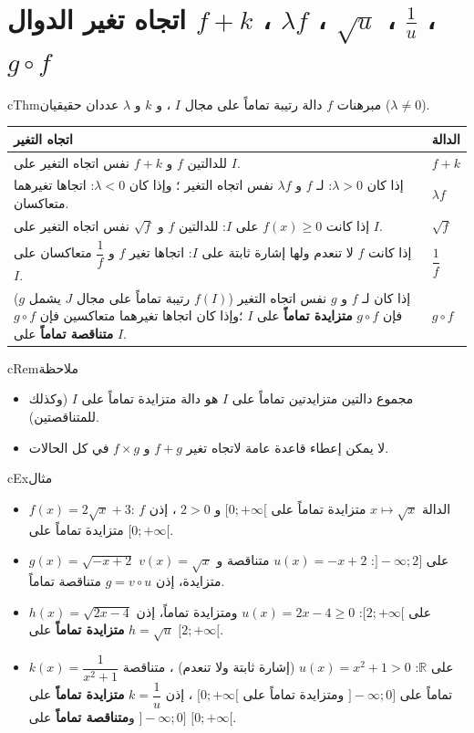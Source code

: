 \documentclass[12pt,a4paper]{article}
\newenvironment{BOX}[2]{\begin{otherlanguage}{english}\begin{arbox}{#1}{#2}}{\end{arbox}\end{otherlanguage}}
\newenvironment{khassia}[1][خاصية]{\begin{BOX}{cThm}{#1}}{\end{BOX}}
\newenvironment{molahada}[1][ملاحظة]{\begin{BOX}{cRem}{#1}}{\end{BOX}}
\newenvironment{mithal}[1][مثال]{\begin{BOX}{cEx}{#1}}{\end{BOX}}
\newcommand{\R}{\mathbb{R}}
\begin{document}
\section{اتجاه تغير الدوال $f+k$ ، $\lambda f$ ، $\sqrt u$ ، $\frac1u$ ، $g\circ f$}
\begin{khassia}[مبرهنات]
$f$ دالة رتيبة تماماً على مجال $I$ ، و $k$ و $\lambda$ عددان حقيقيان ($\lambda\ne0$).
\begin{center}
\renewcommand{\arraystretch}{1.5}
\begin{tabular}{|>{\centering\arraybackslash}m{12.6cm}|>{\centering\arraybackslash}m{2.4cm}|}\hline
\textbf{اتجاه التغير} & \textbf{الدالة}\\\hline
للدالتين $f$ و $f+k$ نفس اتجاه التغير على $I$. & $f+k$\\\hline
إذا كان $\lambda>0$: لـ $f$ و $\lambda f$ نفس اتجاه التغير ؛ وإذا كان $\lambda<0$: اتجاها تغيرهما متعاكسان. & $\lambda f$\\\hline
إذا كانت $f(x)\ge0$ على $I$: للدالتين $f$ و $\sqrt f$ نفس اتجاه التغير على $I$. & $\sqrt f$\\\hline
إذا كانت $f$ لا تنعدم ولها إشارة ثابتة على $I$: اتجاها تغير $f$ و $\dfrac1f$ متعاكسان على $I$. & $\dfrac1f$\\\hline
($g$ رتيبة تماماً على مجال $J$ يشمل $f(I)$) \newline إذا كان لـ $f$ و $g$ نفس اتجاه التغير فإن $g\circ f$ \textbf{متزايدة تماماً} على $I$ ؛\newline وإذا كان اتجاها تغيرهما متعاكسين فإن $g\circ f$ \textbf{متناقصة تماماً} على $I$. & $g\circ f$\\\hline
\end{tabular}
\end{center}
\end{khassia}
\begin{molahada}
\begin{itemize}
\item مجموع دالتين متزايدتين تماماً على $I$ هو دالة متزايدة تماماً على $I$ (وكذلك للمتناقصتين).
\item لا يمكن إعطاء قاعدة عامة لاتجاه تغير $f+g$ و $f\times g$ في كل الحالات.
\end{itemize}
\end{molahada}
\begin{mithal}
\begin{itemize}
\item $f(x)=2\sqrt x+3$: الدالة $x\mapsto\sqrt x$ متزايدة تماماً على $[0;+\infty[$ و $2>0$ ، إذن $f$ متزايدة تماماً على $[0;+\infty[$.
\item $g(x)=\sqrt{-x+2}$ على $]-\infty;2]$: $u(x)=-x+2$ متناقصة و $v(x)=\sqrt x$ متزايدة، إذن $g=v\circ u$ متناقصة تماماً.
\item $h(x)=\sqrt{2x-4}$ على $[2;+\infty[$: $u(x)=2x-4\ge0$ ومتزايدة تماماً، إذن $h=\sqrt u$ \textbf{متزايدة تماماً} على $[2;+\infty[$.
\item $k(x)=\dfrac{1}{x^2+1}$ على $\R$: $u(x)=x^2+1>0$ (إشارة ثابتة ولا تنعدم) ، متناقصة تماماً على $]-\infty;0]$ ومتزايدة تماماً على $[0;+\infty[$ ، إذن $k=\dfrac1u$ \textbf{متزايدة تماماً} على $]-\infty;0]$ و\textbf{متناقصة تماماً} على $[0;+\infty[$.
\end{itemize}
\end{mithal}
\end{document}
